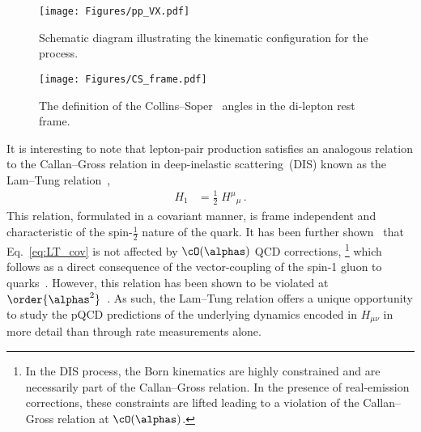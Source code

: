 \begin{figure}
  \begin{minipage}[t]{.48\linewidth}
  	\centering
  	\texttt{[image: Figures/pp\_VX.pdf]}
  	\caption{Schematic diagram illustrating the kinematic configuration for the process.}
  	\label{fig:pp_VX}
  \end{minipage}
  \hfill
  \begin{minipage}[t]{.48\linewidth}
  	\centering
  	\texttt{[image: Figures/CS\_frame.pdf]}
  	\caption{The definition of the Collins--Soper~\cite{Collins:1977iv} angles in the di-lepton rest frame.}
  	\label{fig:CS_frame}
  \end{minipage}
\end{figure}

It is interesting to note that lepton-pair production satisfies an analogous relation to the Callan--Gross relation in deep-inelastic scattering~(DIS) known as the Lam--Tung relation~\cite{Lam:1978pu,Lam:1978zr,Lam:1980uc}, 
\begin{align}
  H_1 &= \frac{1}{2} \; H^{\mu}{}_{\mu} \,.
  \label{eq:LT_cov}
\end{align}
This relation, formulated in a covariant manner, is frame independent and characteristic of the spin-$\tfrac{1}{2}$ nature of the quark. 
It has been further shown~\cite{Lam:1980uc} that Eq.~\eqref{eq:LT_cov} is not affected by $\cO(\alphas)$ QCD corrections,%
\footnote{
In the DIS process, the Born kinematics are highly constrained and 
are necessarily part of the Callan--Gross relation. In the presence of
real-emission corrections, these constraints are lifted leading to
a violation of the Callan--Gross relation at $\cO(\alphas)$.
}
which follows as a direct consequence of the vector-coupling of the spin-1 gluon to quarks~\cite{ArteagaRomero:1983ji}.
However, this relation has been shown to be violated at $\order{\alphas^2}$~\cite{Mirkes:1994dp}.
As such, the Lam--Tung relation offers a unique opportunity to study the pQCD predictions of the underlying dynamics encoded in $H_{\mu\nu}$ in more detail than through rate measurements alone.

